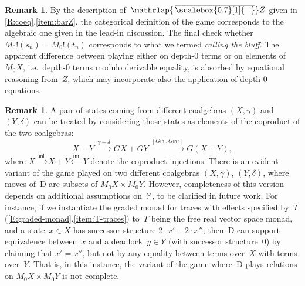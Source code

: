\documentclass[sigconf,
			final%
			nonacm
                        ]{acmart}
\numberwithin{equation}{section}
\numberwithin{equation}{section}
\theoremstyle{plain}
\theoremstyle{definition}
\newtheorem{rem}[thm]{Remark}
\newcommand{\mybar}[3]{%
  \mathrlap{\hspace{#2}\overline{\scalebox{#1}[1]{\hphantom{\ensuremath{#3}}\vphantom{\rule{0pt}{5.5pt}}}}}\ensuremath{#3}
}
\newcommand{\barZ}{\mybar{0.7}{1.75pt}{Z}}
\newcommand{\inl}{\mathsf{inl}}
\newcommand{\inr}{\mathsf{inr}}
\newcommand{\xra}[1]{\xrightarrow{~#1~}}
\newcommand{\xla}[1]{\xleftarrow{~#1~}}
\newcommand{\M}{\mathbb{M}}                   %
\newcommand{\CalG}{\mathcal{G}}             %
\newcommand{\CalS}{\mathcal{S}}        %
\begin{document}
\begin{rem}
  By the description of~$\barZ$ given in
  \cref{R:coeq}.\ref{item:barZ}, the categorical definition of the
  game corresponds to the algebraic one given in the lead-in
  discussion. The final check whether $M_0!(s_n)=M_0!(t_n)$
  corresponds to what we termed \emph{calling the bluff}. The apparent
  difference between playing either on depth-0 terms or on elements
  of~$M_0X$, i.e.~depth-0 terms modulo derivable equality, is absorbed
  by equational reasoning from~$Z$, which may incorporate also the
  application of depth-0 equations.
\end{rem}
\begin{rem}
  A pair of states coming from different coalgebras $(X,\gamma)$ and
  $(Y,\delta)$ can be treated by considering those states as elements
  of the coproduct of the two coalgebras:
  \[
    X+Y \xra{\gamma + \delta} GX + GY \xra{[G\inl, G\inr]} G(X+Y),
  \]
  where $X \xra{\inl} X+Y \xla{\inr} Y$ denote the coproduct
  injections. There is an evident variant of the game played on two
  different coalgebras $(X,\gamma)$, $(Y,\delta)$, where moves of~D
  are subsets of $M_0X\times M_0Y$. However, completeness of this
  version depends on additional assumptions on~$\M$, to be clarified
  in future work. For instance, if we instantiate the graded monad for
  traces with effects specified by~$T$
  (\cref{E:graded-monad}.\ref{item:T-traces}) to~$T$ being the free
  real vector space monad, and a state~$x\in X$ has successor
  structure $2\cdot x'-2\cdot x''$, then~D can support equivalence
  between~$x$ and a deadlock~$y\in Y$ (with successor structure~$0$)
  by claiming that $x'=x''$, but not by any equality between terms
  over~$X$ with terms over~$Y$. That is, in this instance, the variant
  of the game where~D plays relations on $M_0X\times M_0Y$ is not
  complete.
\end{rem}
\end{document}
